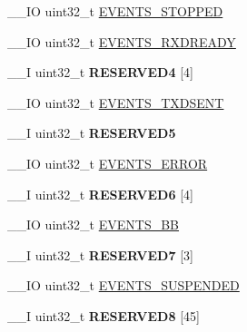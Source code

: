 \begin{DoxyCompactItemize}
\item 
\+\_\+\+\_\+\+I\+O uint32\+\_\+t \hyperlink{struct_n_r_f___t_w_i___type_a2e211e6c17bf1b556ca4ce3fd195ff33}{E\+V\+E\+N\+T\+S\+\_\+\+S\+T\+O\+P\+P\+E\+D}
\item 
\+\_\+\+\_\+\+I\+O uint32\+\_\+t \hyperlink{struct_n_r_f___t_w_i___type_acbc08d8a789a7c6fa8f9a40b59b4b97d}{E\+V\+E\+N\+T\+S\+\_\+\+R\+X\+D\+R\+E\+A\+D\+Y}
\item 
\hypertarget{struct_n_r_f___t_w_i___type_a379a1bdb6305658f04fd51739ab58730}{}\+\_\+\+\_\+\+I uint32\+\_\+t {\bfseries R\+E\+S\+E\+R\+V\+E\+D4} \mbox{[}4\mbox{]}\label{struct_n_r_f___t_w_i___type_a379a1bdb6305658f04fd51739ab58730}

\item 
\+\_\+\+\_\+\+I\+O uint32\+\_\+t \hyperlink{struct_n_r_f___t_w_i___type_a5fb27d97a45d531e2786438c02c1beb5}{E\+V\+E\+N\+T\+S\+\_\+\+T\+X\+D\+S\+E\+N\+T}
\item 
\hypertarget{struct_n_r_f___t_w_i___type_adaac19a9cd7f721001f031bcaa6d0787}{}\+\_\+\+\_\+\+I uint32\+\_\+t {\bfseries R\+E\+S\+E\+R\+V\+E\+D5}\label{struct_n_r_f___t_w_i___type_adaac19a9cd7f721001f031bcaa6d0787}

\item 
\+\_\+\+\_\+\+I\+O uint32\+\_\+t \hyperlink{struct_n_r_f___t_w_i___type_a747e9e4cba38fd2910dbeba7080e7030}{E\+V\+E\+N\+T\+S\+\_\+\+E\+R\+R\+O\+R}
\item 
\hypertarget{struct_n_r_f___t_w_i___type_aeabf04c24c0f8874cb5879b516fa1974}{}\+\_\+\+\_\+\+I uint32\+\_\+t {\bfseries R\+E\+S\+E\+R\+V\+E\+D6} \mbox{[}4\mbox{]}\label{struct_n_r_f___t_w_i___type_aeabf04c24c0f8874cb5879b516fa1974}

\item 
\+\_\+\+\_\+\+I\+O uint32\+\_\+t \hyperlink{struct_n_r_f___t_w_i___type_a09854bd17cf3d537c3643a250799ecff}{E\+V\+E\+N\+T\+S\+\_\+\+B\+B}
\item 
\hypertarget{struct_n_r_f___t_w_i___type_a4acd695ae75477829863844131bd2ec1}{}\+\_\+\+\_\+\+I uint32\+\_\+t {\bfseries R\+E\+S\+E\+R\+V\+E\+D7} \mbox{[}3\mbox{]}\label{struct_n_r_f___t_w_i___type_a4acd695ae75477829863844131bd2ec1}

\item 
\+\_\+\+\_\+\+I\+O uint32\+\_\+t \hyperlink{struct_n_r_f___t_w_i___type_a3ff30c3bb56b96a608f1d24c53f0f04e}{E\+V\+E\+N\+T\+S\+\_\+\+S\+U\+S\+P\+E\+N\+D\+E\+D}
\item 
\hypertarget{struct_n_r_f___t_w_i___type_a2af2cd5f259864c32e30e2bb56868d1f}{}\+\_\+\+\_\+\+I uint32\+\_\+t {\bfseries R\+E\+S\+E\+R\+V\+E\+D8} \mbox{[}45\mbox{]}\label{struct_n_r_f___t_w_i___type_a2af2cd5f259864c32e30e2bb56868d1f}


\end{DoxyCompactItemize}
